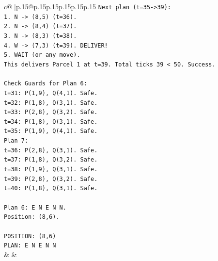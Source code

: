 \documentclass{article}
\begin{document}
{\begin{supertabular}{c@{$\;$}|p{.15\linewidth}@{}p{.15\linewidth}p{.15\linewidth}p{.15\linewidth}p{.15\linewidth}p{.15\linewidth}}
{{{\texttt{Next plan (t=35{-}>39):} \\
\texttt{1. N {-}> (8,5) (t=36).} \\
\texttt{2. N {-}> (8,4) (t=37).} \\
\texttt{3. N {-}> (8,3) (t=38).} \\
\texttt{4. W {-}> (7,3) (t=39). DELIVER!} \\
\texttt{5. WAIT (or any move).} \\
\texttt{This delivers Parcel 1 at t=39. Total ticks 39 < 50. Success.} \\
\\ 
\texttt{Check Guards for Plan 6:} \\
\texttt{t=31: P(1,9), Q(4,1). Safe.} \\
\texttt{t=32: P(1,8), Q(3,1). Safe.} \\
\texttt{t=33: P(2,8), Q(3,2). Safe.} \\
\texttt{t=34: P(1,8), Q(3,1). Safe.} \\
\texttt{t=35: P(1,9), Q(4,1). Safe.} \\
\texttt{Plan 7:} \\
\texttt{t=36: P(2,8), Q(3,1). Safe.} \\
\texttt{t=37: P(1,8), Q(3,2). Safe.} \\
\texttt{t=38: P(1,9), Q(3,1). Safe.} \\
\texttt{t=39: P(2,8), Q(3,2). Safe.} \\
\texttt{t=40: P(1,8), Q(3,1). Safe.} \\
\\ 
\texttt{Plan 6: E N E N N.} \\
\texttt{Position: (8,6).} \\
\\ 
\texttt{POSITION: (8,6)} \\
\texttt{PLAN: E N E N N} \\
            }
        }
    }
    & & \\ \\


\end{supertabular}}
\end{document}

